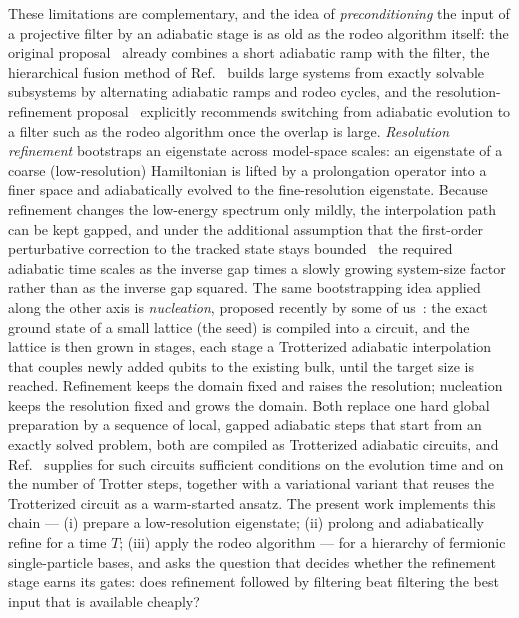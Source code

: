 \documentclass[
  aps,            %
  prc,            %
  reprint,        %
  superscriptaddress,
  floatfix,
  nofootinbib
]{revtex4-2}
\begin{document}
These limitations are complementary, and the idea of \emph{preconditioning} the
input of a projective filter by an adiabatic stage is as old as the rodeo
algorithm itself: the original proposal~\cite{Choi2021} already combines a
short adiabatic ramp with the filter, the hierarchical fusion method of
Ref.~\cite{Patkowski2025fusion} builds large systems from exactly solvable
subsystems by alternating adiabatic ramps and rodeo cycles, and the
resolution-refinement proposal~\cite{Bogner2026} explicitly recommends
switching from adiabatic evolution to a filter such as the rodeo algorithm once
the overlap is large.  \emph{Resolution refinement} bootstraps an eigenstate
across model-space scales: an eigenstate of a coarse (low-resolution)
Hamiltonian is lifted by a prolongation operator into a finer space and
adiabatically evolved to the fine-resolution eigenstate.  Because refinement
changes the low-energy spectrum only mildly, the interpolation path can be
kept gapped, and under the additional assumption that the first-order
perturbative correction to the tracked state stays bounded~\cite{Bogner2026}
the required adiabatic time scales as the inverse gap times a slowly growing
system-size factor rather than as the inverse gap squared.  The same
bootstrapping idea applied along the other axis is \emph{nucleation}, proposed
recently by some of us~\cite{Sadia2026}: the exact ground state of a small
lattice (the seed) is compiled into a circuit, and the lattice is then grown
in stages, each stage a Trotterized adiabatic interpolation that couples newly
added qubits to the existing bulk, until the target size is reached.
Refinement keeps the domain fixed and raises the resolution; nucleation keeps
the resolution fixed and grows the domain.  Both replace one hard global
preparation by a sequence of local, gapped adiabatic steps that start from an
exactly solved problem, both are compiled as Trotterized adiabatic circuits,
and Ref.~\cite{Sadia2026} supplies for such circuits sufficient conditions on
the evolution time and on the number of Trotter steps, together with a
variational variant that reuses the Trotterized circuit as a warm-started
ansatz.  The present work
implements this chain --- (i) prepare a low-resolution eigenstate; (ii) prolong
and adiabatically refine for a time $T$; (iii) apply the rodeo algorithm ---
for a hierarchy of fermionic single-particle bases, and asks the question that
decides whether the refinement stage earns its gates: does refinement followed
by filtering beat filtering the best input that is available cheaply?
\end{document}
